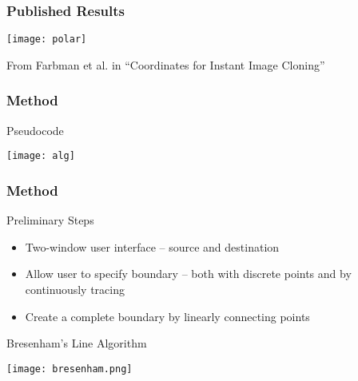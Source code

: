 \documentclass{beamer}
\theoremstyle{remark}
\begin{document}
\begin{frame}[t]
\frametitle{Published Results}

\vfill
\begin{center}
\texttt{[image: polar]}
\end{center}
\vspace{3mm}
From Farbman et al. in ``Coordinates for Instant Image Cloning''
\end{frame}

\begin{comment}
\begin{frame}[t]
 \frametitle{Results | Mean-value}
 \vfill
\begin{center}
\texttt{[image: bigpolar]}
\end{center}
\end{frame}

\begin{frame}[t]
 \frametitle{Results | Mean-value}
 \vfill
\begin{center}
\texttt{[image: huge]}
\end{center}
\end{frame}

\begin{frame}[t]
 \frametitle{Results | Poisson}
 \vfill
\begin{center}
\texttt{[image: poisson]}
\end{center}
\end{frame}
\end{comment}


\begin{frame}[t]
 \frametitle{Method}
 
\begin{block}{Pseudocode}
 \begin{center}
\texttt{[image: alg]}
\end{center}
\end{block}
\end{frame}


\begin{frame}[t]
 \frametitle{Method}
 
\begin{block}{Preliminary Steps}
\begin{itemize}
 \item Two-window user interface -- source and destination
 \pause
 \item Allow user to specify boundary \pause -- both with discrete points and by continuously tracing 
 \pause
 \item Create a complete boundary by linearly connecting points
\end{itemize}
\end{block}
\pause
\begin{block}{Bresenham's Line Algorithm}
\begin{center}
 \texttt{[image: bresenham.png]}
\end{center}
\end{block}
\end{frame}
\end{document}
